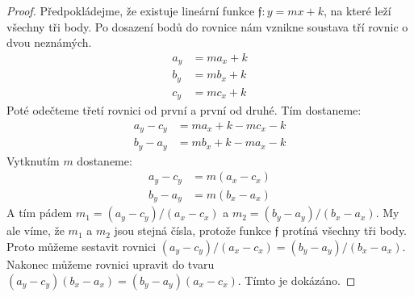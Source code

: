 \begin{proof}
  Předpokládejme, že existuje lineární funkce $\mathfrak{f}: y = mx+k$, na které leží všechny tři body. Po dosazení bodů do rovnice nám vznikne soustava tří rovnic o dvou neznámých.
  \begin{align*}
    a_y & = ma_x+k \\
    b_y & = mb_x+k \\
    c_y & = mc_x+k
  \end{align*}
  Poté odečteme třetí rovnici od první a první od druhé. Tím dostaneme:
  \begin{align*}
    a_y-c_y & = ma_x+k - mc_x -k \\
    b_y-a_y & = mb_x+k -ma_x -k
  \end{align*}
  Vytknutím $m$ dostaneme:
  \begin{align*}
    a_y-c_y & = m(a_x-c_x) \\
    b_y-a_y & = m(b_x-a_x)
  \end{align*}
  A tím pádem $m_1 = (a_y-c_y)/(a_x-c_x)$ a $ m_2=(b_y-a_y)/(b_x-a_x)$. My ale víme, že $m_1$ a $m_2$ jsou stejná čísla, protože funkce $\mathfrak{f}$ protíná všechny tři body. Proto můžeme sestavit rovnici $(a_y-c_y)/(a_x-c_x) = (b_y-a_y)/(b_x-a_x)$. Nakonec můžeme rovnici upravit do tvaru $(a_y-c_y)(b_x-a_x) = (b_y-a_y)(a_x-c_x)$. Tímto je  dokázáno.
\end{proof}